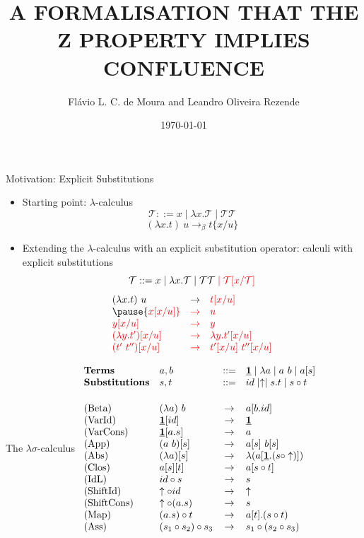 \documentclass[10pt]{beamer}
\title{A FORMALISATION THAT THE Z PROPERTY IMPLIES CONFLUENCE}
\date{\today}
\author{Flávio L. C. de Moura and Leandro Oliveira Rezende}
\institute{Seminário do GTC/UnB}
\newcommand{\term}{{\mathcal{T}}}
\newcommand{\db}[1]{{\bf \underline{#1}}}
\begin{document}
\maketitle

\begin{frame}[fragile]{Motivation: Explicit Substitutions}
  \begin{itemize}
  \item Starting point: $\lambda$-calculus
    $$\term ::= x \mid \lambda x.\term \mid \term\term $$
    $$(\lambda x.t)\ u \to_\beta t\{x/u\}$$
    \pause
    \item Extending the $\lambda$-calculus with an explicit substitution operator: {\color{red} calculi with explicit substitutions} 
    $$\term ::= x \mid \lambda x.\term \mid \term\term\; {\color{red} \mid \term[x/\term]}$$ \pause
    $$\begin{array}{lll}
        (\lambda x.t)\ u &  \to &  {\color{red} t[x/u]} \\ \pause
        {\color{red} x[x/u]} & {\color{red}\to} & {\color{red}u} \\
        {\color{red} y[x/u]} & {\color{red}\to} & {\color{red}y} \\
        {\color{red}(\lambda y.t')[x/u]} &  {\color{red} \to} &  {\color{red} \lambda y. t'[x/u]} \\
        {\color{red} (t'\ t'')[x/u]} & {\color{red}\to} & {\color{red} t'[x/u]\ t''[x/u]} \\
      \end{array}$$
  \end{itemize}
\end{frame}

\begin{frame}{The $\lambda\sigma$-calculus}
  $\begin{array}{llcl}
      \mbox{\bf Terms} &  a,b & ::=  & \db{1} \mid \lambda a \mid a\ b \mid a[s]  \\ 
     \mbox{\bf Substitutions} & s,t & ::= & id \mid \uparrow \mid s.t \mid s \circ t \\[.5cm]
     \mbox{(Beta)} & (\lambda a)\ b & \to &  a[b.id] \\
     \mbox{(VarId)} & \db{1}[id] & \to & \db{1} \\
     \mbox{(VarCons)} & \db{1}[a.s] & \to & a \\
     \mbox{(App)} & (a\ b)[s] & \to &  a[s]\ b[s] \\
     \mbox{(Abs)} & (\lambda a)[s] & \to &  \lambda(a[\db{1}.(s \circ \uparrow)]) \\
     \mbox{(Clos)} & a[s][t] & \to &  a[s\circ t] \\     
     \mbox{(IdL)} & id\circ s & \to & s \\
     \mbox{(ShiftId)} & \uparrow \circ id & \to & \uparrow \\
     \mbox{(ShiftCons)} & \uparrow \circ (a.s) & \to & s \\
     \mbox{(Map)} & (a.s) \circ t & \to & a[t].(s \circ t) \\
     \mbox{(Ass)} & (s_1 \circ s_2) \circ s_3 & \to & s_1 \circ (s_2 \circ s_3)
    \end{array}$
  \end{frame}
\end{document}

